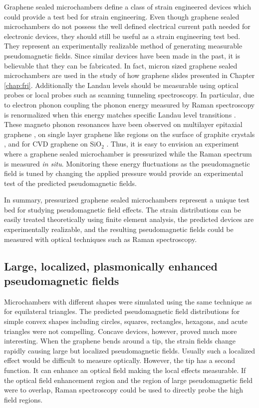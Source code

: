 Graphene sealed microchambers define a class of strain engineered devices which could provide a test bed for strain engineering.
Even though graphene sealed microchambers do not possess the well defined electrical current path needed for electronic devices, they should still be useful as a strain engineering test bed.
They represent an experimentally realizable method of generating measurable pseudomagnetic fields.
Since similar devices have been made in the past, it is believable that they can be fabricated.
In fact, micron sized graphene sealed microchambers are used in the study of how graphene slides presented in Chapter \ref{chap:fri}.
Additionally the Landau levels should be measurable using optical probes or local probes such as scanning tunneling spectroscopy.
In particular, due to electron phonon coupling the phonon energy measured by Raman spectroscopy is renormalized when this energy matches specific Landau level transitions \cite{Goerbig2011}.
These magneto phonon resonances have been observed on multilayer epitaxial graphene \cite{Faugeras2009}, on single layer graphene like regions on the surface of graphite crystals \cite{Faugeras2011}, and for CVD graphene on SiO$_2$ \cite{Kim2013}.
Thus, it is easy to envision an experiment where a graphene sealed microchamber is pressurized while the Raman spectrum is measured \emph{in situ}.
Monitoring these energy fluctuations as the pseudomagnetic field is tuned by changing the applied pressure would provide an experimental test of the predicted pseudomagnetic fields.

In summary, pressurized graphene sealed microchambers represent a unique test bed for studying pseudomagnetic field effects.
The strain distributions can be easily treated theoretically using finite element analysis, the predicted devices are experimentally realizable, and the resulting pseudomagnetic fields could be measured with optical techniques such as Raman spectroscopy.

\subsection{Large, localized, plasmonically enhanced pseudomagnetic fields}
Microchambers with different shapes were simulated using the same technique as for equilateral triangles.
The predicted pseudomagnetic field distributions for simple convex shapes including circles, squares, rectangles, hexagons, and acute triangles were not compelling.
Concave devices, however, proved much more interesting.
When the graphene bends around a tip, the strain fields change rapidly causing large but localized pseudomagnetic fields.
Usually such a localized effect would be difficult to measure optically.
However, the tip has a second function.
It can enhance an optical field making the local effects measurable.
If the optical field enhancement region and the region of large pseudomagnetic field were to overlap, Raman spectroscopy could be used to directly probe the high field regions. 


